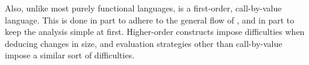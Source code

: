 Also, unlike most purely functional languages, \D{} is a first-order,
call-by-value language. This is done in part to adhere to the general flow of
\cite{size-change}, and in part to keep the analysis simple at first.
Higher-order constructs impose difficulties when deducing changes in size, and
evaluation strategies other than call-by-value impose a similar sort of
difficulties.








